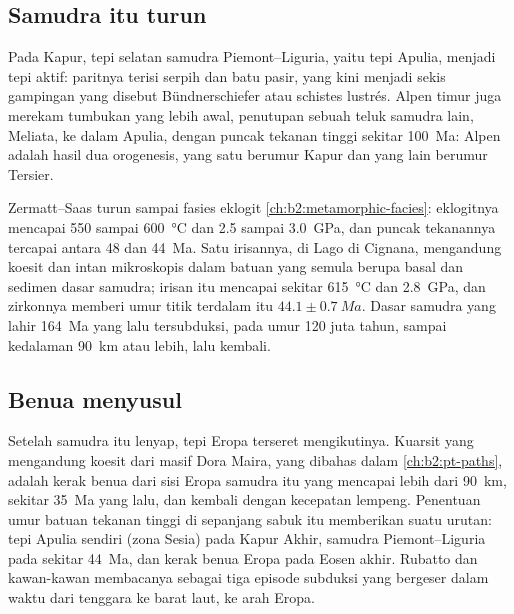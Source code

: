 \subsection*{Samudra itu turun}

Pada Kapur, tepi selatan samudra Piemont--Liguria, yaitu tepi Apulia, menjadi
tepi aktif: paritnya terisi serpih dan batu pasir, yang kini menjadi sekis gampingan
yang disebut Bündnerschiefer atau schistes lustrés. Alpen timur juga merekam tumbukan
yang lebih awal, penutupan sebuah teluk samudra lain, Meliata, ke dalam Apulia, dengan
puncak tekanan tinggi sekitar \qty{100}{Ma}: Alpen adalah hasil dua orogenesis, yang satu
berumur Kapur dan yang lain berumur Tersier.

 Zermatt--Saas turun sampai fasies eklogit
\cref{ch:b2:metamorphic-facies}: eklogitnya mencapai 550 sampai \qty{600}{\celsius} dan 2.5 sampai
\qty{3.0}{GPa}, dan puncak tekanannya tercapai antara 48 dan \qty{44}{Ma}. Satu irisannya,
di Lago di Cignana, mengandung koesit dan intan mikroskopis dalam batuan yang semula berupa basal
dan sedimen dasar samudra; irisan itu mencapai sekitar \qty{615}{\celsius} dan \qty{2.8}{GPa}, dan
zirkonnya memberi umur titik terdalam itu $44.1 \pm \qty{0.7}{Ma}$. Dasar samudra yang lahir
\qty{164}{Ma} yang lalu tersubduksi, pada umur 120 juta tahun, sampai kedalaman
\qty{90}{km} atau lebih, lalu kembali.

\subsection*{Benua menyusul}

Setelah samudra itu lenyap, tepi Eropa terseret mengikutinya. Kuarsit
yang mengandung koesit dari masif Dora Maira, yang dibahas dalam \cref{ch:b2:pt-paths}, adalah kerak benua
dari sisi Eropa samudra itu yang mencapai lebih dari \qty{90}{km}, sekitar
\qty{35}{Ma} yang lalu, dan kembali dengan kecepatan lempeng. Penentuan umur batuan tekanan tinggi
di sepanjang sabuk itu memberikan suatu urutan: tepi Apulia sendiri (zona Sesia) pada Kapur
Akhir,  samudra Piemont--Liguria pada sekitar \qty{44}{Ma}, dan
kerak benua Eropa pada Eosen akhir. Rubatto dan kawan-kawan membacanya sebagai tiga episode subduksi yang bergeser dalam waktu dari
tenggara ke barat laut, ke arah Eropa.

